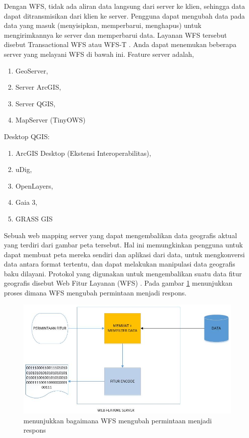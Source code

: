 Dengan WFS, tidak ada aliran data langsung dari server ke klien, sehingga data dapat ditransmisikan dari klien ke server. Pengguna dapat mengubah data pada data yang masuk (menyisipkan, memperbarui, menghapus) untuk mengirimkannya ke server dan memperbarui data. Layanan WFS tersebut disebut Transactional WFS atau WFS-T \cite{khair2016pembuatan}. Anda dapat menemukan beberapa server yang melayani WFS di bawah ini.
Feature server adalah,
\begin{enumerate}
\item GeoServer,
\item Server ArcGIS,
\item Server QGIS,
\item MapServer (TinyOWS)
\end{enumerate}

Desktop QGIS:
\begin{enumerate}
\item ArcGIS Desktop (Ekstensi Interoperabilitas),
\item uDig,
\item OpenLayers,
\item Gaia 3,
\item GRASS GIS
\end{enumerate}

Sebuah web mapping server yang dapat mengembalikan data geografis aktual yang terdiri dari gambar peta tersebut. Hal ini memungkinkan pengguna untuk dapat membuat peta mereka sendiri dan aplikasi dari data, untuk mengkonversi data antara format tertentu, dan dapat melakukan manipulasi data geografis baku dilayani. Protokol yang digunakan untuk mengembalikan suatu data fitur geografis disebut Web Fitur Layanan (WFS) \cite{purab2015penyajian}. Pada gambar \ref{labelgambar1} menunjukkan proses dimana WFS mengubah permintaan menjadi respons.

\begin{figure}[htbp]
\centering
\includegraphics[width=1\textwidth]{pictures/WFS_RSPN}
\caption{menunjukkan bagaimana WFS mengubah permintaan menjadi respons}
\label{labelgambar1}
\end{figure}

